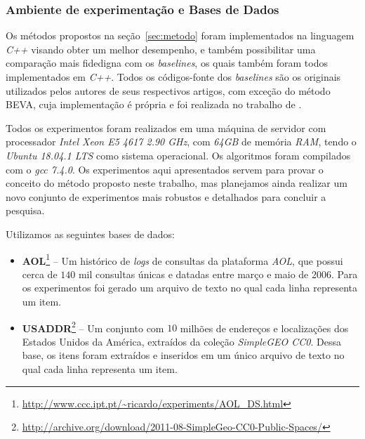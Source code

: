 \subsubsection{Ambiente de experimentação e Bases de Dados}

Os métodos propostos na seção~\ref{sec:metodo} foram implementados na linguagem \textit{C++} visando obter um melhor desempenho, e também possibilitar uma comparação mais fidedigna com os \textit{baselines}, os quais também foram todos implementados em \textit{C++}. Todos os códigos-fonte dos \textit{baselines} são os originais utilizados pelos autores de seus respectivos artigos, com exceção do método BEVA, cuja implementação é própria e foi realizada no trabalho de \cite{berg2020}.

Todos os experimentos foram realizados em uma máquina de servidor com processador \textit{Intel \textsuperscript{\textregistered} Xeon E5 4617 2.90 GHz}, com \textit{64GB} de memória \textit{RAM}, tendo o \textit{Ubuntu 18.04.1 LTS} como sistema operacional. Os algoritmos foram compilados com o \textit{gcc 7.4.0}. Os experimentos aqui apresentados servem para provar o conceito do método proposto neste trabalho, mas planejamos ainda realizar um novo conjunto de experimentos mais robustos e detalhados para concluir a pesquisa.

Utilizamos as seguintes bases de dados:

\begin{itemize}
    \item \textbf{AOL}\footnote{\url{http://www.ccc.ipt.pt/~ricardo/experiments/AOL_DS.html}} -- Um histórico de \textit{logs} de consultas da plataforma \textit{AOL}, que possui cerca de $140$ mil consultas únicas e datadas entre março e maio de 2006. Para os experimentos foi gerado um arquivo de texto no qual cada linha representa um item. 
    \item \textbf{USADDR}\footnote{\url{http://archive.org/download/2011-08-SimpleGeo-CC0-Public-Spaces/}} -- Um conjunto com $10$ milhões de endereços e localizações dos Estados Unidos da América, extraídos da coleção \textit{SimpleGEO CC0}. Dessa base, os itens foram extraídos e inseridos em um único arquivo de texto no qual cada linha representa um item.    
\end{itemize} 
 

